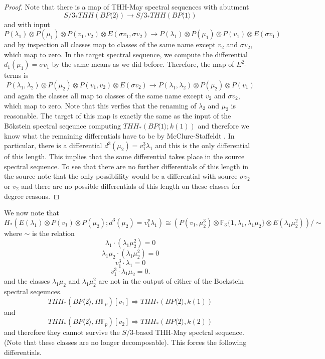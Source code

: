 \begin{proof}
Note that there is a map of THH-May spectral sequences with abutment 
\[S/3_*THH(BP\langle2\rangle)\rightarrow S/3_*THH(BP\langle 1 \rangle )\] 
and with input 
\[ P(\lambda_1)\otimes P(\mu_1)\otimes P(v_1,v_2)\otimes E(\sigma v_1,\sigma v_2) \rightarrow P(\lambda_1)\otimes P(\mu_1) \otimes P(v_1)\otimes E(\sigma v_1) \]
and by inspection all classes map to classes of the same name except $v_2$ and $\sigma v_2$, which map to zero. In the target spectral sequence, we compute the differential $d_1(\mu_1)=\sigma v_1$ by the same means as we did before. Therefore, the map of $E^2$-terms is 
\[ P(\lambda_1,\lambda_2)\otimes P(\mu_2)\otimes P(v_1,v_2)\otimes E(\sigma v_2) \rightarrow  P(\lambda_1,\lambda_2)\otimes P(\mu_2)\otimes P(v_1) \]
and again the classes all map to classes of the same name except $v_2$ and $\sigma v_2$, which map to zero. Note that this verfies that the renaming of $\lambda_2$ and $\mu_2$ is reasonable. The target of this map is exactly the same as the input of the B\"okstein spectral seqeunce computing $THH_*(BP\langle 1\rangle ; k(1))$ and therefore we know what the remaining differentials have to be by McClure-Staffeldt \cite{McClureStaffeldt}. In particular, there is a differential $d^3(\mu_2)=v_1^3\lambda_1$ and this is the only differential of this length. This implies that the same differential takes place in the source spectral sequence. To see that there are no further differentials of this length in the source note that the only possiblility would be a differential with source $\sigma v_2$ or $v_2$ and there are no possible differentials of this length on these classes for degree reasons. 
\end{proof}
We now note that 
\[ H_*(E(\lambda_1)\otimes P(v_1)\otimes P(\mu_2 ); d^3(\mu_2)=v_1^p\lambda_1) \cong \left (P(v_1,\mu_2^3)\otimes \mathbb{F}_3\{1,\lambda_1, \lambda_1\mu_2\}\otimes E(\lambda_1\mu_2^2)\right )/\sim\]
where $\sim$ is the relation 
\[ \lambda_1\cdot (\lambda_1\mu_2^2) =0 \]
\[ \lambda_1\mu_2 \cdot (\lambda_1\mu_2^2) =0 \]
\[ v_1^3\cdot \lambda_1 =0 \]
\[ v_1^3 \cdot \lambda_1\mu_2 = 0. \]
and the classes $\lambda_1\mu_2$ and $\lambda_1\mu_2^2$ are not in the output of either of the Bockstein spectral seqeunces. 
\[ THH_*(BP\langle 2\rangle , H\mathbb{F}_p)[v_1] \Rightarrow  THH_*(BP\langle 2 \rangle , k(1) ) \]
and 
\[ THH_*(BP\langle 2\rangle , H\mathbb{F}_p)[v_2] \Rightarrow  THH_*(BP\langle 2 \rangle , k(2) )\]
and therefore they cannot survive the $S/3$-based THH-May spectral sequence. (Note that these classes are no longer decomposable). This forces the following differentials. 
